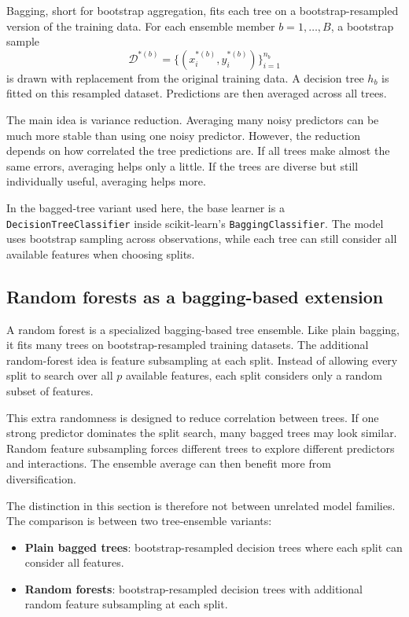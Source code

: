 Bagging, short for bootstrap aggregation, fits each tree on a bootstrap-resampled version of the training data. For each ensemble member \(b=1,\ldots,B\), a bootstrap sample
\[
\mathcal{D}^{*(b)}
=
\{(x_i^{*(b)},y_i^{*(b)})\}_{i=1}^{n_b}
\]
is drawn with replacement from the original training data. A decision tree \(h_b\) is fitted on this resampled dataset. Predictions are then averaged across all trees.

The main idea is variance reduction. Averaging many noisy predictors can be much more stable than using one noisy predictor. However, the reduction depends on how correlated the tree predictions are. If all trees make almost the same errors, averaging helps only a little. If the trees are diverse but still individually useful, averaging helps more.

In the bagged-tree variant used here, the base learner is a \texttt{DecisionTreeClassifier} inside scikit-learn's \texttt{BaggingClassifier}. The model uses bootstrap sampling across observations, while each tree can still consider all available features when choosing splits.

\subsection{Random forests as a bagging-based extension}

A random forest is a specialized bagging-based tree ensemble. Like plain bagging, it fits many trees on bootstrap-resampled training datasets. The additional random-forest idea is feature subsampling at each split. Instead of allowing every split to search over all \(p\) available features, each split considers only a random subset of features.

This extra randomness is designed to reduce correlation between trees. If one strong predictor dominates the split search, many bagged trees may look similar. Random feature subsampling forces different trees to explore different predictors and interactions. The ensemble average can then benefit more from diversification.

The distinction in this section is therefore not between unrelated model families. The comparison is between two tree-ensemble variants:

\begin{itemize}[leftmargin=*]
    \item \textbf{Plain bagged trees}: bootstrap-resampled decision trees where each split can consider all features.
    \item \textbf{Random forests}: bootstrap-resampled decision trees with additional random feature subsampling at each split.
\end{itemize}

